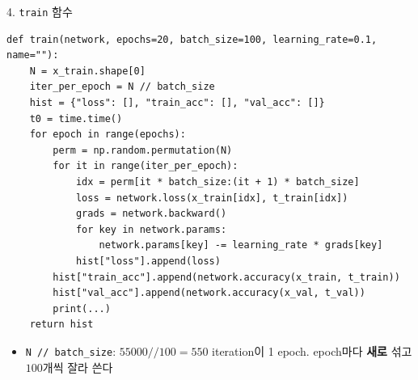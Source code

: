 \documentclass[aspectratio=169,11pt]{beamer}
\newcommand{\code}[1]{\texttt{#1}}
\begin{document}
\begin{frame}[fragile]{4. \code{train} 함수}
\begin{lstlisting}[basicstyle=\ttfamily\fontsize{7.2}{8.0}\selectfont]
def train(network, epochs=20, batch_size=100, learning_rate=0.1, name=""):
    N = x_train.shape[0]
    iter_per_epoch = N // batch_size
    hist = {"loss": [], "train_acc": [], "val_acc": []}
    t0 = time.time()
    for epoch in range(epochs):
        perm = np.random.permutation(N)
        for it in range(iter_per_epoch):
            idx = perm[it * batch_size:(it + 1) * batch_size]
            loss = network.loss(x_train[idx], t_train[idx])
            grads = network.backward()
            for key in network.params:
                network.params[key] -= learning_rate * grads[key]
            hist["loss"].append(loss)
        hist["train_acc"].append(network.accuracy(x_train, t_train))
        hist["val_acc"].append(network.accuracy(x_val, t_val))
        print(...)
    return hist
\end{lstlisting}
\small
\begin{itemize}
\item \code{N // batch\_size}: $55000 // 100 = 550$ iteration이 1 epoch. epoch마다 \textbf{새로} 섞고 $100$개씩 잘라 쓴다
\end{itemize}
\end{frame}
\end{document}
